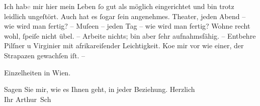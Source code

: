 \pstart
           Ich hab\textcolor{gray}{e} mir hier mein Leben{ }ſo
               gut als möglich eingerichtet und bin trotz \label{K_L02963-2v}\label{K_L02963-2} leidlich {\pb}ungeſtört. Auch hat es{ }ſogar{ }ſein angenehmes.
               Theater, jeden Abend – wie wird man fertig? – Muſeen – jeden Tag – wie wird man
               fertig? Wohne recht wohl,{ }ſpeiſe nicht übel. – Arbeite nichts; bin aber{ }ſehr
               aufnahmsfähig. – {\pb}Entbehre Pilſner u
               Virginier mit afrikareiſender Leichtigkeit.
                  Ko{\geminationm}e mir vor wie einer, der Strapazen gewachſen iſt.
               –\pend
           
\pstart
           Einzelheiten in Wien.\pend
           
\pstart
           Sagen Sie mir, wie es Ihnen geht, in jeder Beziehung. Herzlich {\\}Ihr
                  \spacefill\mbox{Arthur Sch}\pend
           \endnumbering{}  \newcommand{\dateiname}{L02963}\newcommand{\titel}{Arthur Schnitzler an Felix Salten, 26. 4. 1897}\newcommand{\editorInnen}{Martin Anton Müller und Laura Untner}
